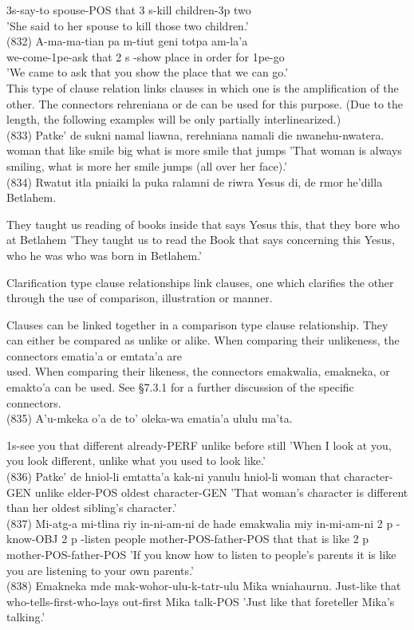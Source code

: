 \documentclass[10pt]{article}
\begin{document}
3s-say-to spouse-POS that 3 s-kill children-3p two\\
'She said to her spouse to kill those two children.'\\
(832) A-ma-ma-tian pa m-tiut geni totpa am-la'a\\
we-come-1pe-ask that 2 s -show place in order for 1pe-go\\
'We came to ask that you show the place that we can go.'\\
This type of clause relation links clauses in which one is the amplification of the other. The connectors rehreniana or de can be used for this purpose. (Due to the length, the following examples will be only partially interlinearized.)\\
(833) Patke' de sukni namal liawna, rerehniana namali die nwanehu-nwatera.\\
woman that like smile big what is more smile that jumps 'That woman is always smiling, what is more her smile jumps (all over her face).'\\
(834) Rwatut itla pniaiki la puka ralamni de riwra Yesus di, de rmor he'dilla Betlahem.

They taught us reading of books inside that says Yesus this, that they bore who at Betlahem 'They taught us to read the Book that says concerning this Yesus, who he was who was born in Betlahem.'

Clarification type clause relationships link clauses, one which clarifies the other through the use of comparison, illustration or manner.

Clauses can be linked together in a comparison type clause relationship. They can either be compared as unlike or alike. When comparing their unlikeness, the connectors ematia'a or emtata'a are\\
used. When comparing their likeness, the connectors emakwalia, emakneka, or emakto'a can be used. See §7.3.1 for a further discussion of the specific connectors.\\
(835) A'u-mkeka o'a de to' oleka-wa ematia'a ululu ma'ta.

1s-see you that different already-PERF unlike before still 'When I look at you, you look different, unlike what you used to look like.'\\
(836) Patke' de hniol-li emtatta'a kak-ni yanulu hniol-li woman that character-GEN unlike elder-POS oldest character-GEN 'That woman's character is different than her oldest sibling's character.'\\
(837) Mi-atg-a mi-tlina riy in-ni-am-ni de hade emakwalia miy in-mi-am-ni 2 p -know-OBJ 2 p -listen people mother-POS-father-POS that that is like 2 p mother-POS-father-POS 'If you know how to listen to people's parents it is like you are listening to your own parents.'\\
(838) Emakneka mde mak-wohor-ulu-k-tatr-ulu Mika wniahaurnu. Just-like that who-tells-first-who-lays out-first Mika talk-POS 'Just like that foreteller Mika's talking.'
\end{document}
